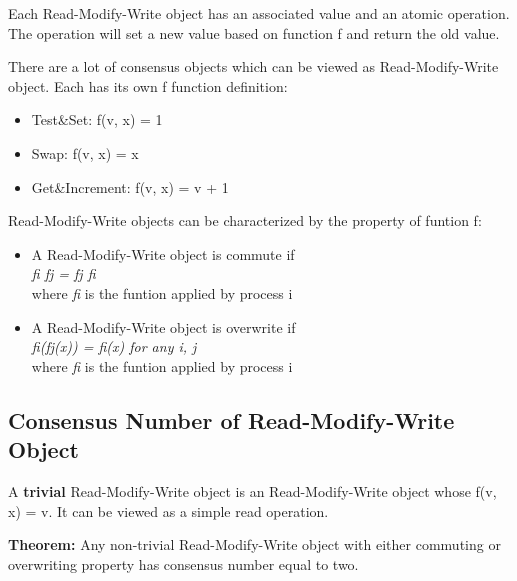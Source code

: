 \documentclass[twoside]{article}
\begin{document}
Each Read-Modify-Write object has an associated value and an atomic operation. The operation will set a new value based on function f and return the old value. 

There are a lot of consensus objects which can be viewed as Read-Modify-Write object. Each has its own f function definition:
\begin{itemize}
  \item Test\&Set: f(v, x) = 1
  \item Swap: f(v, x) = x
  \item Get\&Increment: f(v, x) = v + 1
\end{itemize}

Read-Modify-Write objects can be characterized by the property of funtion f:
\begin{itemize}
  \item A Read-Modify-Write object is commute if \\ \textit{fi fj = fj fi} \\ where \textit{fi} is the funtion applied by process i
  \item A Read-Modify-Write object is overwrite if \\ \textit{fi(fj(x)) = fi(x)   for any i, j} \\ where \textit{fi} is the funtion applied by process i
\end{itemize}

\subsection{Consensus Number of Read-Modify-Write Object}

A \textbf{trivial} Read-Modify-Write object is an Read-Modify-Write object whose f(v, x) = v. It can be viewed as a simple read operation. 

\textbf{Theorem:} Any non-trivial Read-Modify-Write object with either commuting or overwriting property has consensus number equal to two. 
\end{document}
